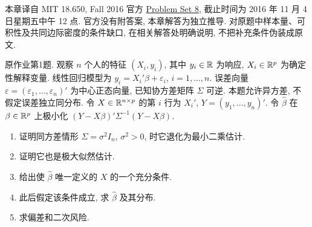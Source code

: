 \label{chap:ps08}
本章译自 MIT 18.650, Fall 2016 官方 \href{https://ocw.mit.edu/courses/18-650-statistics-for-applications-fall-2016/resources/problem-set-8/}{Problem Set 8}, 截止时间为 2016 年 11 月 4 日星期五中午 12 点. 官方没有附答案, 本章解答为独立推导. 对原题中样本量、可积性及共同边际密度的条件缺口, 在相关解答处明确说明, 不把补充条件伪装成原文.

\begin{exercise}\label{ps08:p01}
原作业第1题. 观察 $n$ 个人的特征 $(X_i,y_i)$, 其中 $y_i\in\mathbb R$ 为响应, $X_i\in\mathbb R^p$ 为确定性解释变量. 线性回归模型为 $y_i=X_i'\beta+\varepsilon_i$, $i=1,\ldots,n$. 误差向量 $\varepsilon=(\varepsilon_1,\ldots,\varepsilon_n)'$ 为中心正态向量, 已知协方差矩阵 $\Sigma$ 可逆. 本题允许异方差, 不假定误差独立同分布. 令 $X\in\mathbb R^{n\times p}$ 的第 $i$ 行为 $X_i'$, $Y=(y_1,\ldots,y_n)'$. 令 $\hat\beta$ 在 $\beta\in\mathbb R^p$ 上极小化 $(Y-X\beta)'\Sigma^{-1}(Y-X\beta)$.
\begin{enumerate}[label=\arabic*.]
\item 证明同方差情形 $\Sigma=\sigma^2I_n$, $\sigma^2>0$, 时它退化为最小二乘估计.
\item 证明它也是极大似然估计.
\item 给出使 $\hat\beta$ 唯一定义的 $X$ 的一个充分条件.
\item 此后假定该条件成立, 求 $\hat\beta$ 及其分布.
\item 求偏差和二次风险.
\end{enumerate}
\end{exercise}
